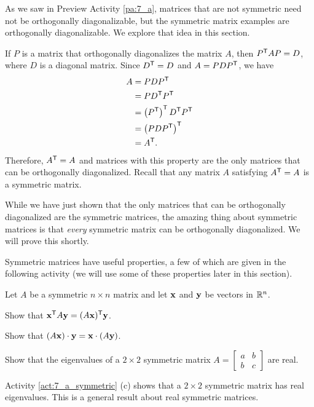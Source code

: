 
As we saw in Preview Activity \ref{pa:7_a}, matrices that are not symmetric need not be orthogonally diagonalizable, but the symmetric matrix examples are orthogonally diagonalizable. We explore that idea in this section. 

 If $P$ is a matrix that orthogonally diagonalizes the matrix $A$, then $P^{\mathsf{T}}AP = D$, where $D$ is a diagonal matrix. Since $D^{\mathsf{T}} = D$ and $A = PDP^{\mathsf{T}}$, we have
\begin{align*}
A &= PDP^{\mathsf{T}} \\
    &= PD^{\mathsf{T}}P^{\mathsf{T}} \\
    &= \left(P^{\mathsf{T}}\right)^{\mathsf{T}}D^{\mathsf{T}}P^{\mathsf{T}} \\
    &= \left(PDP^{\mathsf{T}}\right)^{\mathsf{T}} \\
    &= A^{\mathsf{T}}.
\end{align*}
Therefore, $A^{\mathsf{T}} = A$ and matrices with this property are the only matrices that can be orthogonally diagonalized. Recall that any matrix $A$ satisfying $A^{\mathsf{T}} = A$ is a symmetric matrix. 

While we have just shown that the only matrices that can be orthogonally diagonalized are the symmetric matrices, the amazing thing about symmetric matrices is that \emph{every} symmetric matrix can be orthogonally diagonalized. We will prove this shortly.

Symmetric matrices have useful properties, a few of which are given in the following activity (we will use some of these properties later in this section).


\begin{activity} \label{act:7_a_symmetric} Let $A$ be a symmetric $n \times n$ matrix and let $\mathbf{x}$ and $\mathbf{y}$ be vectors in $\mathbb{R}^n$.
	\ba
	\item Show that $\mathbf{x}^{\mathsf{T}} A \mathbf{y} = (A\mathbf{x})^{\mathsf{T}} \mathbf{y}$.
	
	
	\item Show that $(A\mathbf{x}) \cdot \mathbf{y} = \mathbf{x} \cdot (A\mathbf{y})$.
	

	\item Show that the eigenvalues of a $2 \times 2$ symmetric matrix $A = \left[ \begin{array}{cc} a&b\\b&c \end{array} \right]$ are real.	
	
	\ea
\end{activity}

Activity \ref{act:7_a_symmetric} (c) shows that a $2 \times 2$ symmetric matrix has real eigenvalues. This is a general result about real symmetric matrices.

